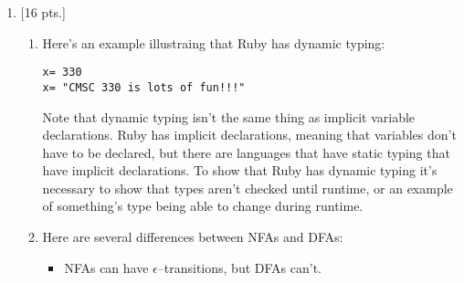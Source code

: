 \documentclass[11pt,fleqn]{article}
\begin{document}

  \begin{enumerate}

    \addtolength{\itemsep}{15mm}


    \item {[16 pts.]}

          \begin{enumerate}

            \vspace{-2.75mm}

            \addtolength{\itemsep}{4mm}

            \item Here's an example illustraing that Ruby has dynamic
                  typing:

                  \vspace{-2mm}

                  \begin{verbatim}
x= 330
x= "CMSC 330 is lots of fun!!!"\end{verbatim}

                  \vspace{-1.5mm}

                  Note that dynamic typing isn't the same thing as implicit
                  variable declarations.  Ruby has implicit declarations,
                  meaning that variables don't have to be declared, but
                  there are languages that have static typing that have
                  implicit declarations.  To show that Ruby has dynamic
                  typing it's necessary to show that types aren't checked
                  until runtime, or an example of something's type being
                  able to change during runtime.

            \item Here are several differences between NFAs and DFAs:

                  \vspace{0mm}

                  \begin{itemize}

                    \addtolength{\itemsep}{1.5mm}

                    \item NFAs can have $\epsilon$--transitions, but DFAs
                          can't.


\end{itemize}
\end{enumerate}
\end{enumerate}
\end{document}
